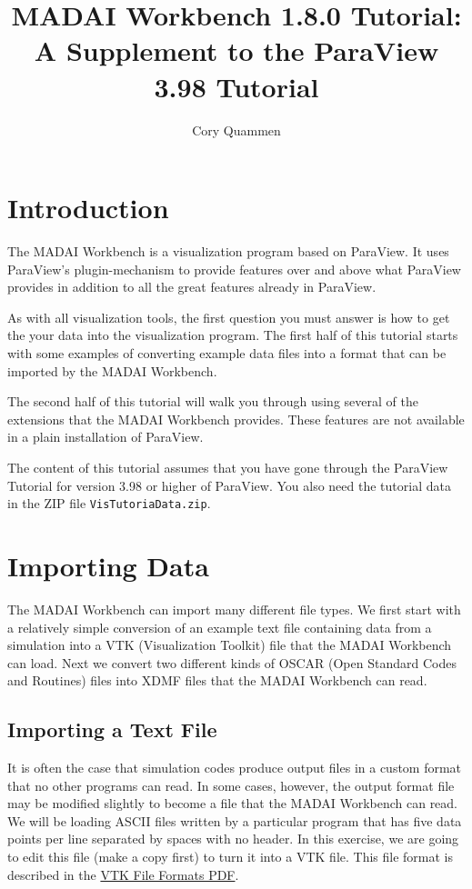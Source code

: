 \documentclass[12pt]{article}
\title{MADAI Workbench 1.8.0 Tutorial: \\A Supplement to the ParaView 3.98 Tutorial}
\author{Cory Quammen}
\date{} %
\newcommand{\file}[1]{\texttt{#1}}
\begin{document}
\maketitle
\tableofcontents

\section{Introduction}

The MADAI Workbench is a visualization program based on ParaView. It uses ParaView's plugin-mechanism to provide features over and above what ParaView provides in addition to all the great features already in ParaView.

As with all visualization tools, the first question you must answer is how to get the your data into the visualization program. The first half of this tutorial starts with some examples of converting example data files into a format that can be imported by the MADAI Workbench. 

The second half of this tutorial will walk you through using several of the extensions that the MADAI Workbench provides. These features are not available in a plain installation of ParaView.

The content of this tutorial assumes that you have gone through the ParaView Tutorial for version 3.98 or higher of ParaView. You also need the tutorial data in the ZIP file \file{VisTutoriaData.zip}.

\section{Importing Data}

The MADAI Workbench can import many different file types. We first start with a relatively simple conversion of an example text file containing data from a simulation into a VTK (Visualization Toolkit) file that the MADAI Workbench can load. Next we convert two different kinds of OSCAR (Open Standard Codes and Routines) files into XDMF files that the MADAI Workbench can read.

\subsection{Importing a Text File}

It is often the case that simulation codes produce output files in a custom format that no other programs can read. In some cases, however, the output format file may be modified slightly to become a file that the MADAI Workbench can read. We will be loading ASCII files written by a particular program that has five data points per line separated by spaces with no header. In this exercise, we are going to edit this file (make a copy first) to turn it into a VTK file. This file format is described in the \href{http://www.vtk.org/VTK/img/file-formats.pdf}{VTK File Formats PDF}.
\end{document}
